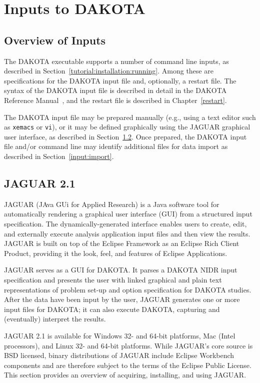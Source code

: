 \chapter{Inputs to DAKOTA}\label{input}

\section{Overview of Inputs}\label{input:overview}

The DAKOTA executable supports a number of command line inputs, as
described in Section~\ref{tutorial:installation:running}.  Among
these are specifications for the DAKOTA input file and, optionally, a
restart file.  The syntax of the DAKOTA input file is described in detail 
in the DAKOTA Reference Manual~\cite{RefMan}, and the restart file is
described in Chapter~\ref{restart}.

The DAKOTA input file may be prepared manually (e.g., using a text
editor such as \texttt{xemacs} or \texttt{vi}), or it may be defined
graphically using the JAGUAR graphical user interface, as described in
Section~\ref{input:gui}.  Once prepared, the DAKOTA input file and/or
command line may identify additional files for data import as
described in Section~\ref{input:import}.

\section{JAGUAR 2.1}\label{input:gui}

JAGUAR (JAva GUi for Applied Research) is a Java software tool for
automatically rendering a graphical user interface (GUI) from a
structured input specification.  The dynamically-generated interface
enables users to create, edit, and externally execute analysis
application input files and then view the results.  JAGUAR is built on
top of the Eclipse Framework \cite{Eclipse} as an Eclipse Rich
Client Product, providing it the look, feel, and features of Eclipse
Applications.

JAGUAR serves as a GUI for DAKOTA.  It parses a DAKOTA NIDR input
specification and presents the user with linked graphical and plain
text representations of problem set-up and option specification for
DAKOTA studies. After the data have been input by the user, JAGUAR
generates one or more input files for DAKOTA; it can also execute
DAKOTA, capturing and (eventually) interpret the results.

JAGUAR 2.1 is available for Windows 32- and 64-bit platforms, 
Mac (Intel processors), and Linux 32- and 64-bit platforms. 
While JAGUAR's core source is BSD licensed,
binary distributions of JAGUAR include Eclipse Workbench components
and are therefore subject to the terms of the Eclipse Public License.
This section provides an overview of acquiring, installing, and using JAGUAR.


